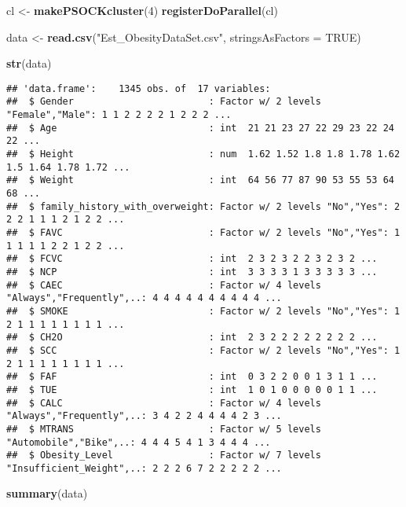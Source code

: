 \documentclass[
]{article}
\newenvironment{Shaded}{\begin{snugshade}}{\end{snugshade}}
\newcommand{\AttributeTok}[1]{\textcolor[rgb]{0.13,0.29,0.53}{#1}}
\newcommand{\ConstantTok}[1]{\textcolor[rgb]{0.56,0.35,0.01}{#1}}
\newcommand{\DecValTok}[1]{\textcolor[rgb]{0.00,0.00,0.81}{#1}}
\newcommand{\FunctionTok}[1]{\textcolor[rgb]{0.13,0.29,0.53}{\textbf{#1}}}
\newcommand{\NormalTok}[1]{#1}
\newcommand{\OtherTok}[1]{\textcolor[rgb]{0.56,0.35,0.01}{#1}}
\newcommand{\StringTok}[1]{\textcolor[rgb]{0.31,0.60,0.02}{#1}}
\begin{document}
\begin{Shaded}
\begin{Highlighting}[]
\NormalTok{cl }\OtherTok{\textless{}{-}} \FunctionTok{makePSOCKcluster}\NormalTok{(}\DecValTok{4}\NormalTok{)  }
\FunctionTok{registerDoParallel}\NormalTok{(cl)}


\NormalTok{data }\OtherTok{\textless{}{-}} \FunctionTok{read.csv}\NormalTok{(}\StringTok{"Est\_ObesityDataSet.csv"}\NormalTok{, }\AttributeTok{stringsAsFactors =} \ConstantTok{TRUE}\NormalTok{) }

\FunctionTok{str}\NormalTok{(data)}
\end{Highlighting}
\end{Shaded}

\begin{verbatim}
## 'data.frame':    1345 obs. of  17 variables:
##  $ Gender                        : Factor w/ 2 levels "Female","Male": 1 1 2 2 2 2 1 2 2 2 ...
##  $ Age                           : int  21 21 23 27 22 29 23 22 24 22 ...
##  $ Height                        : num  1.62 1.52 1.8 1.8 1.78 1.62 1.5 1.64 1.78 1.72 ...
##  $ Weight                        : int  64 56 77 87 90 53 55 53 64 68 ...
##  $ family_history_with_overweight: Factor w/ 2 levels "No","Yes": 2 2 2 1 1 1 2 1 2 2 ...
##  $ FAVC                          : Factor w/ 2 levels "No","Yes": 1 1 1 1 1 2 2 1 2 2 ...
##  $ FCVC                          : int  2 3 2 3 2 2 3 2 3 2 ...
##  $ NCP                           : int  3 3 3 3 1 3 3 3 3 3 ...
##  $ CAEC                          : Factor w/ 4 levels "Always","Frequently",..: 4 4 4 4 4 4 4 4 4 4 ...
##  $ SMOKE                         : Factor w/ 2 levels "No","Yes": 1 2 1 1 1 1 1 1 1 1 ...
##  $ CH2O                          : int  2 3 2 2 2 2 2 2 2 2 ...
##  $ SCC                           : Factor w/ 2 levels "No","Yes": 1 2 1 1 1 1 1 1 1 1 ...
##  $ FAF                           : int  0 3 2 2 0 0 1 3 1 1 ...
##  $ TUE                           : int  1 0 1 0 0 0 0 0 1 1 ...
##  $ CALC                          : Factor w/ 4 levels "Always","Frequently",..: 3 4 2 2 4 4 4 4 2 3 ...
##  $ MTRANS                        : Factor w/ 5 levels "Automobile","Bike",..: 4 4 4 5 4 1 3 4 4 4 ...
##  $ Obesity_Level                 : Factor w/ 7 levels "Insufficient_Weight",..: 2 2 2 6 7 2 2 2 2 2 ...
\end{verbatim}

\begin{Shaded}
\begin{Highlighting}[]
\FunctionTok{summary}\NormalTok{(data)}
\end{Highlighting}
\end{Shaded}
\end{document}
